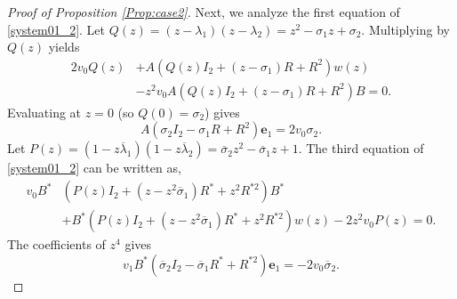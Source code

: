 \documentclass[10pt,a4paper]{amsart}
\begin{document}
\begin{proof}[Proof of Proposition \ref{Prop:case2}]
	Next, we analyze the first equation of \eqref{system01_2}. Let $Q(z) = (z-\lambda_1)(z-\lambda_2) = z^2 - \sigma_1 z + \sigma_2$. Multiplying by $Q(z)$ yields
	\begin{align}\label{eq:1c2}
		2v_0 Q(z) &+ A \left( Q(z)I_2 + (z-\sigma_1) R + R^{2} \right) w(z) \nonumber \\
		& - z^2 v_0 A \left( Q(z)I_2 + (z-\sigma_1) R + R^{2} \right) B = 0.
	\end{align}
	Evaluating at $z=0$ (so $Q(0)=\sigma_2$) gives
	\begin{equation}\label{eq:c21z0}
		A \left( \sigma_2 I_2 - \sigma_1 R + R^{2} \right) \mathbf{e}_1 = 2v_0 \sigma_2.
	\end{equation}
 Let $P(z) = (1-z\overline{\lambda}_1)(1-z\overline{\lambda}_2) = \overline{\sigma}_2 z^2 - \overline{\sigma}_1 z + 1$. The third equation of \eqref{system01_2} can be written as,
	\begin{align}\label{eq:3c2}
		v_0 B^* & \left( P(z)I_2 + (z-z^2\overline{\sigma}_1) R^* + z^2R^{*2} \right) B^* \nonumber \\
		& + B^* \left( P(z)I_2 + (z-z^2\overline{\sigma}_1) R^* + z^2R^{*2} \right) w(z)- 2z^2 v_0 P(z) = 0.
	\end{align}
The coefficients of $z^4$ gives
	\begin{equation}\label{eq:c21z4}
	v_1	B^* \left( \overline{\sigma}_2 I_2 - \overline{\sigma}_1 R^* + R^{*2} \right) \mathbf{e}_1 = -2v_0 \overline{\sigma}_2.
	\end{equation}


\end{proof}
\end{document}
